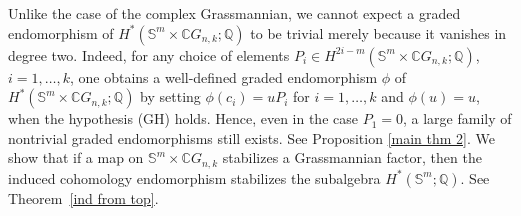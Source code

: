 \documentclass{amsart}
\newtheorem{proposition}[theorem]{Proposition}
\newcommand{\thmref}[1]{Theorem~\ref{#1}}
\begin{document}
	Unlike the case of the complex Grassmannian, we cannot expect a graded
	endomorphism of $H^*(\mathbb S^m \times \mathbb CG_{n,k};\mathbb Q)$ to be
	trivial merely because it vanishes in degree two. Indeed, for any choice of
	elements $P_i \in H^{2i-m}(\mathbb S^m \times \mathbb CG_{n,k};\mathbb Q)$,
	$i=1,\dots,k$, one obtains a well-defined graded endomorphism $\phi$ of
	$H^*(\mathbb S^m \times \mathbb CG_{n,k};\mathbb Q)$ by setting
	$\phi(c_i) = uP_i$ for $i=1,\dots,k$ and $\phi(u)=u$, when the hypothesis (GH) holds. Hence, even in the case $P_1 = 0$, a large family of nontrivial graded endomorphisms still exists. See Proposition \ref{main thm 2}.
	We show that if a map on $\mathbb S^{m}\times \mathbb C G_{n,k}$ stabilizes a Grassmannian factor, then the induced cohomology endomorphism stabilizes the subalgebra $H^*(\mathbb S^{m};\mathbb Q)$. See \thmref{ind from top}.
	
	

	
\end{document}
